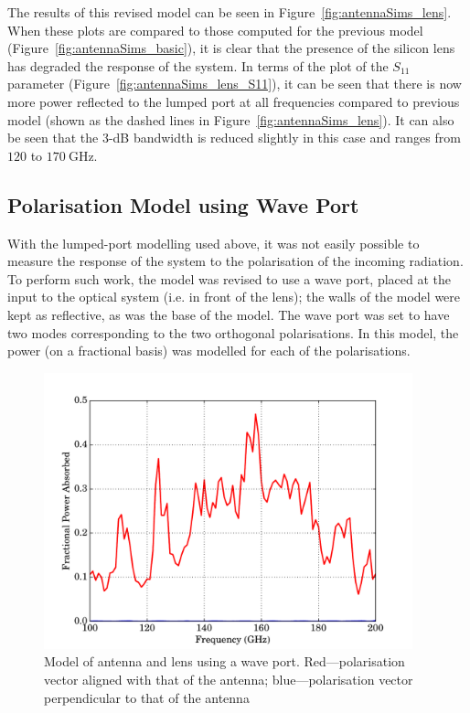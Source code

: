 \par 
The results of this revised model can be seen in Figure~\ref{fig:antennaSims_lens}. When these plots are compared to those computed for the previous model (Figure~\ref{fig:antennaSims_basic}), it is clear that the presence of the silicon lens has degraded the response of the system. In terms of the plot of the $S_{11}$ parameter (Figure~\ref{fig:antennaSims_lens_S11}), it can be seen that there is now more power reflected to the lumped port at all frequencies compared to previous model (shown as the dashed lines in Figure~\ref{fig:antennaSims_lens}). It can also be seen that the 3-dB bandwidth is reduced slightly in this case and ranges from $120$ to $170~\mathrm{GHz}$.
%
\subsection{Polarisation Model using Wave Port}\label{ssec:antennaSims_LensForw}
With the lumped-port modelling used above, it was not easily possible to measure the response of the system to the polarisation of the incoming radiation. To perform such work, the model was revised to use a wave port, placed at the input to the optical system (i.e. in front of the lens); the walls of the model were kept as reflective, as was the base of the model. The wave port was set to have two modes corresponding to the two orthogonal polarisations. In this model, the power (on a fractional basis) was modelled for each of the polarisations.
\begin{figure}[tb]
\begin{center}
\includegraphics[width = 0.95\textwidth]{figures/antennaSim_lensForw}
\caption[Model of antenna and lens using a wave port]{Model of antenna and lens using a wave port. Red---polarisation vector aligned with that of the antenna; blue---polarisation vector perpendicular to that of the antenna}
\label{fig:antennaSims_lensForw}
\end{center}
\end{figure}
